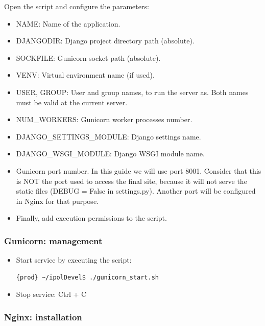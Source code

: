 Open the script and configure the parameters:
\begin{itemize}
\item NAME: Name of the application.
\item DJANGODIR: Django project directory path (absolute).
\item SOCKFILE: Gunicorn socket path (absolute).
\item VENV: Virtual environment name (if used).
\item USER, GROUP: User and group names, to run the server as. Both names must be valid at the current server.
\item NUM\_WORKERS: Gunicorn worker processes number.
\item DJANGO\_SETTINGS\_MODULE: Django settings name.
\item DJANGO\_WSGI\_MODULE: Django WSGI module name.
\item Gunicorn port number. In this guide we will use port 8001. Consider that this is NOT the port used to access the final site, because it will not serve the static files (DEBUG = False in settings.py). Another port will be configured in Nginx for that purpose.
\item Finally, add execution permissions to the script.
\end{itemize}

\subsubsection{Gunicorn: management}
\begin{itemize}
\item Start service by executing the script:
\begin{lstlisting}[language=Bash]
{prod} ~/ipolDevel$ ./gunicorn_start.sh
\end{lstlisting}

\item Stop service: Ctrl + C
\end{itemize}


\subsubsection{Nginx: installation}


